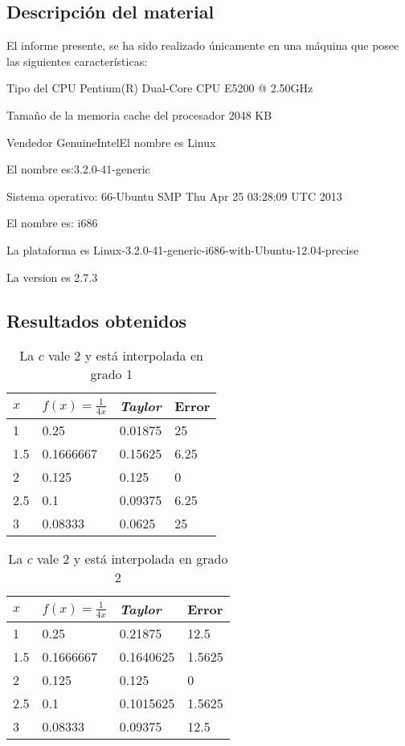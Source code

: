 \documentclass[a4paper,12pt]{article}
\begin{document}
\subsection{Descripción del material}
El informe presente, se ha sido realizado únicamente en una máquina que posee las siguientes características:

Tipo del CPU Pentium(R) Dual-Core  CPU      E5200  @ 2.50GHz

Tamaño de la memoria cache del procesador 2048 KB

Vendedor GenuineIntelEl nombre es Linux

El nombre es:3.2.0-41-generic

Sistema operativo: 66-Ubuntu SMP Thu Apr 25 03:28:09 UTC 2013

El nombre es: i686

La plataforma es Linux-3.2.0-41-generic-i686-with-Ubuntu-12.04-precise

La version es 2.7.3
\newpage
\subsection{Resultados obtenidos}
\begin{table}[!hbt]
\begin{center}
\begin{tabular}[c]{||l | l ||l|l||}
\hline
\hline
$x$  & $f(x)=\frac{1}{4x}$ &{\em Taylor} & Error \\
\hline
1 &0.25& 0.01875 & 25\\
\hline
1.5 &0.1666667&0.15625& 6.25\\
\hline
2 &0.125 &0.125 &  0 \\
\hline
2.5 &0.1 &0.09375 &  6.25 \\
\hline
3 &  0.08333 &  0.0625 &  25 \\
\hline
\hline
\end{tabular}
\caption{La $c$ vale 2 y está interpolada en grado 1}
\end{center}
\end{table}

\begin{table}[!hbt]
\begin{center}
\begin{tabular}[c]{||l | l ||l|l||}
\hline
\hline
$x$  & $f(x)=\frac{1}{4x}$ &{\em Taylor} & Error \\
\hline
1 &0.25 & 0.21875 &12.5 \\
\hline
1.5 &0.1666667  & 0.1640625& 1.5625  \\
\hline
2 &0.125 &0.125 &  0 \\
\hline
2.5 &0.1 &0.1015625 & 1.5625  \\
\hline
3 &  0.08333 &  0.09375& 12.5  \\
\hline
\hline
\end{tabular}
\caption{La $c$ vale 2 y está interpolada en grado 2}
\end{center}
\end{table}
\end{document}
